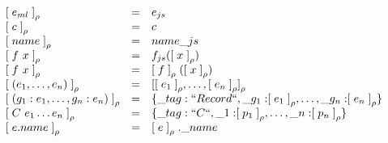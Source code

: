 \begin{center}
$
\begin{array}{lll}
\mathrel{{[}} e_{ml} \mathrel{{]}} _{\rho} &=& e_{js} \\
\mathrel{{[}} c \mathrel{{]}} _{\rho} &=& c \\
\mathrel{{[}} name \mathrel{{]}} _{\rho} &=& name\_js \\
\mathrel{{[}} f~x \mathrel{{]}} _{\rho} &=&  f_{js}(\mathrel{{[}} x \mathrel{{]}} _{\rho}) \\
\mathrel{{[}} f~x \mathrel{{]}} _{\rho} &=& \mathrel{{[}} f \mathrel{{]}} _{\rho} (\mathrel{{[}} x \mathrel{{]}} _{\rho}) \\
\mathrel{{[}} (e_1, \ldots, e_n) \mathrel{{]}} _{\rho} &=& \mathrel{{[}} \mathrel{{[}} e_1 \mathrel{{]}} _{\rho}, \ldots, \mathrel{{[}} e_n \mathrel{{]}} _{\rho} \mathrel{{]}} _{\rho} \\
\mathrel{{[}} (g_1:e_1, \ldots, g_n:e_n) \mathrel{{]}} _{\rho} &=& \{ \_tag: ``Record``, \_g_1: \mathrel{{[}} e_1 \mathrel{{]}} _{\rho}, \ldots, \_g_n: \mathrel{{[}} e_n \mathrel{{]}} _{\rho} \} \\
\mathrel{{[}} C~e_1 \ldots e_n  \mathrel{{]}} _{\rho} &=& \{ \_tag: ``C``, \_1: \mathrel{{[}} p_1 \mathrel{{]}} _{\rho}, \ldots, \_n: \mathrel{{[}} p_n \mathrel{{]}} _{\rho} \} \\
\mathrel{{[}} e.name \mathrel{{]}} _{\rho} &=& \mathrel{{[}} e \mathrel{{]}} _{\rho}.\_name 
\end{array}
$
\captionsetup{type=lstlisting}
\label{tbl:tr_expr}
\end{center}

